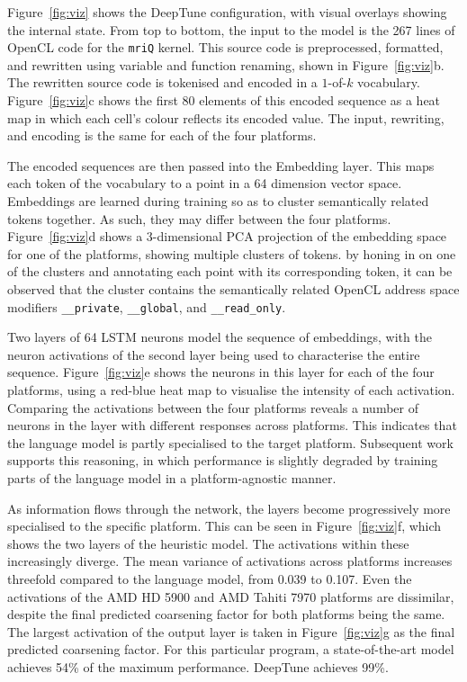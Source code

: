 Figure~\ref{fig:viz} shows the DeepTune configuration, with visual overlays showing the internal state. From top to bottom, the input to the model is the 267 lines of OpenCL code for the \texttt{mriQ} kernel. This source code is preprocessed, formatted, and rewritten using variable and function renaming, shown in Figure~\ref{fig:viz}b. The rewritten source code is tokenised and encoded in a $1$-of-$k$ vocabulary. Figure~\ref{fig:viz}c shows the first 80 elements of this encoded sequence as a heat map in which each cell's colour reflects its encoded value. The input, rewriting, and encoding is the same for each of the four platforms.

The encoded sequences are then passed into the Embedding layer. This maps each token of the vocabulary to a point in a 64 dimension vector space. Embeddings are learned during training so as to cluster semantically related tokens together. As such, they may differ between the four platforms. Figure~\ref{fig:viz}d shows a 3-dimensional PCA projection of the embedding space for one of the platforms, showing multiple clusters of tokens.  by honing in on one of the clusters and annotating each point with its corresponding token, it can be observed that the cluster contains the semantically related OpenCL address space modifiers \texttt{\_\_private}, \texttt{\_\_global}, and \texttt{\_\_read\_only}.

Two layers of 64 LSTM neurons model the sequence of embeddings, with the neuron activations of the second layer being used to characterise the entire sequence. Figure~\ref{fig:viz}e shows the neurons in this layer for each of the four platforms, using a red-blue heat map to visualise the intensity of each activation. Comparing the activations between the four platforms reveals a number of neurons in the layer with different responses across platforms. This indicates that the language model is partly specialised to the target platform. Subsequent work~\cite{Ben-nun2018} supports this reasoning, in which performance is slightly degraded by training parts of the language model in a platform-agnostic manner.

As information flows through the network, the layers become progressively more specialised to the specific platform. This can be seen in Figure~\ref{fig:viz}f, which shows the two layers of the heuristic model. The activations within these increasingly diverge. The mean variance of activations across platforms increases threefold compared to the language model, from 0.039 to 0.107. Even the activations of the AMD HD 5900 and AMD Tahiti 7970 platforms are dissimilar, despite the final predicted coarsening factor for both platforms being the same. The largest activation of the output layer is taken in Figure~\ref{fig:viz}g as the final predicted coarsening factor. For this particular program, a state-of-the-art model achieves 54\% of the maximum performance. DeepTune achieves 99\%.
